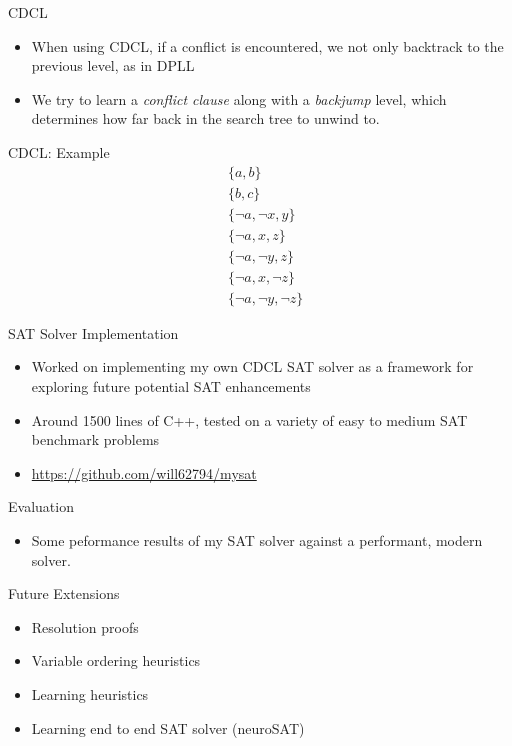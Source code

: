 \documentclass{beamer}
\begin{document}
\begin{frame}{CDCL}
\begin{itemize}
    \item When using CDCL, if a conflict is encountered, we not only backtrack to the previous level, as in DPLL
    \item We try to learn a \textit{conflict clause} along with a \textit{backjump} level, which determines how far back in the search tree to unwind to.
\end{itemize}
\end{frame}

\begin{frame}{CDCL: Example}
    \begin{align*}
        &\{a,b\}\\
        &\{b,c\}\\
        &\{\neg a, \neg x, y\} \\
        &\{\neg a, x, z\} \\
        &\{ \neg a, \neg y, z\} \\
        &\{ \neg a, x, \neg z\} \\
        &\{ \neg a, \neg y, \neg z\}
    \end{align*}
\end{frame}

\begin{frame}{SAT Solver Implementation}
    \begin{itemize}
        \item Worked on implementing my own CDCL SAT solver as a framework for exploring future potential SAT enhancements
        \item Around 1500 lines of C++, tested on a variety of easy to medium SAT benchmark problems
        \item \url{https://github.com/will62794/mysat}
    \end{itemize}
\end{frame}

\begin{frame}{Evaluation}
    \begin{itemize}
        \item Some peformance results of my SAT solver against a performant, modern solver.
    \end{itemize}
\end{frame}

\begin{frame}{Future Extensions}
    \begin{itemize}
        \item Resolution proofs
        \item Variable ordering heuristics
        \item Learning heuristics
        \item Learning end to end SAT solver (neuroSAT)
    \end{itemize}
\end{frame}



\end{document}
